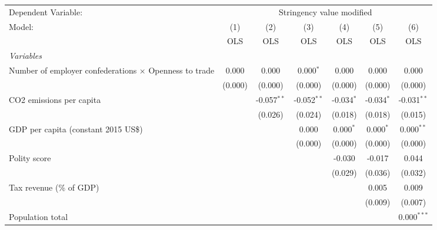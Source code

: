 
\begingroup
\centering
\begin{tabular}{lcccccc}
   \toprule
   Dependent Variable: & \multicolumn{6}{c}{Stringency value modified}\\
   Model:                                                        & (1)     & (2)           & (3)           & (4)          & (5)          & (6)\\  
                                                                 &  OLS    & OLS           & OLS           & OLS          & OLS          & OLS\\  
   \midrule
   \emph{Variables}\\
   Number of employer confederations $\times$ Openness to trade  & 0.000   & 0.000         & 0.000$^{*}$   & 0.000        & 0.000        & 0.000\\   
                                                                 & (0.000) & (0.000)       & (0.000)       & (0.000)      & (0.000)      & (0.000)\\   
   CO2 emissions per capita                                      &         & -0.057$^{**}$ & -0.052$^{**}$ & -0.034$^{*}$ & -0.034$^{*}$ & -0.031$^{**}$\\   
                                                                 &         & (0.026)       & (0.024)       & (0.018)      & (0.018)      & (0.015)\\   
   GDP per capita (constant 2015 US\$)                           &         &               & 0.000         & 0.000$^{*}$  & 0.000$^{*}$  & 0.000$^{**}$\\   
                                                                 &         &               & (0.000)       & (0.000)      & (0.000)      & (0.000)\\   
   Polity score                                                  &         &               &               & -0.030       & -0.017       & 0.044\\   
                                                                 &         &               &               & (0.029)      & (0.036)      & (0.032)\\   
   Tax revenue (\% of GDP)                                       &         &               &               &              & 0.005        & 0.009\\   
                                                                 &         &               &               &              & (0.009)      & (0.007)\\   
   Population total                                              &         &               &               &              &              & 0.000$^{***}$\\   

\end{tabular}
